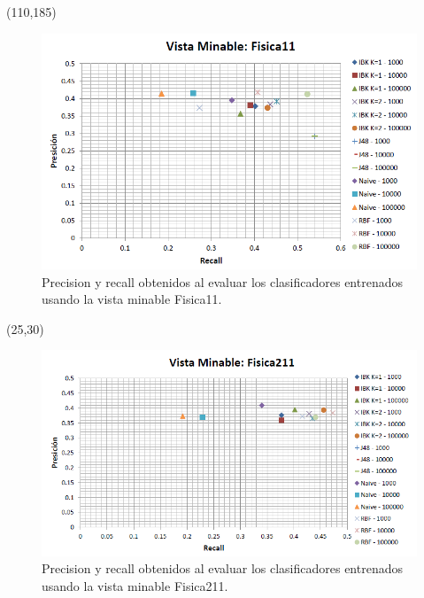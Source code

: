 \documentclass{article}
\begin{document}
\begin{textblock}{80}(110,185)
\begin{figure}[!htb]
\begin{centering}
\includegraphics[scale=0.4]{fisica11}
\par\end{centering}
\caption{Precision y recall obtenidos al evaluar los clasificadores entrenados usando la vista minable Fisica11.}
\label{fig:figura4}
\end{figure}
\end{textblock}

\clearpage

\begin{textblock}{80}(25,30)
\begin{figure}[!htb]
\begin{centering}
\includegraphics[scale=0.4]{fisica211}
\par\end{centering}
\caption{Precision y recall obtenidos al evaluar los clasificadores entrenados usando la vista minable Fisica211.}
\label{fig:figura5}
\end{figure}
\end{textblock}
\end{document}
